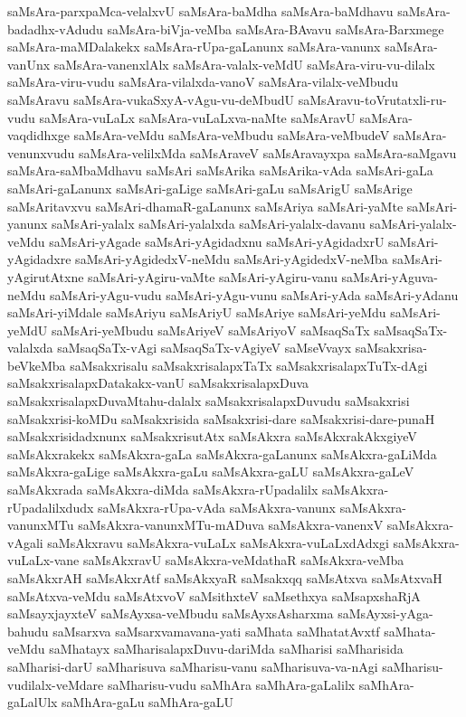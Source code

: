 {saMsAra-parxpaMca-velalxvU
saMsAra-baMdha
saMsAra-baMdhavu
saMsAra-badadhx-vAdudu
saMsAra-biVja-veMba
saMsAra-BAvavu
saMsAra-Barxmege
saMsAra-maMDalakekx
saMsAra-rUpa-gaLanunx
saMsAra-vanunx
saMsAra-vanUnx
saMsAra-vanenxlAlx
saMsAra-valalx-veMdU
saMsAra-viru-vu-dilalx
saMsAra-viru-vudu
saMsAra-vilalxda-vanoV
saMsAra-vilalx-veMbudu
saMsAravu
saMsAra-vukaSxyA-vAgu-vu-deMbudU
saMsAravu-toVrutatxli-ru-vudu
saMsAra-vuLaLx
saMsAra-vuLaLxva-naMte
saMsAravU
saMsAra-vaqdidhxge
saMsAra-veMdu
saMsAra-veMbudu
saMsAra-veMbudeV
saMsAra-venunxvudu
saMsAra-velilxMda
saMsAraveV
saMsAravayxpa
saMsAra-saMgavu
saMsAra-saMbaMdhavu
saMsAri
saMsArika
saMsArika-vAda
saMsAri-gaLa
saMsAri-gaLanunx
saMsAri-gaLige
saMsAri-gaLu
saMsArigU
saMsArige
saMsAritavxvu
saMsAri-dhamaR-gaLanunx
saMsAriya
saMsAri-yaMte
saMsAri-yanunx
saMsAri-yalalx
saMsAri-yalalxda
saMsAri-yalalx-davanu
saMsAri-yalalx-veMdu
saMsAri-yAgade
saMsAri-yAgidadxnu
saMsAri-yAgidadxrU
saMsAri-yAgidadxre
saMsAri-yAgidedxV-neMdu
saMsAri-yAgidedxV-neMba
saMsAri-yAgirutAtxne
saMsAri-yAgiru-vaMte
saMsAri-yAgiru-vanu
saMsAri-yAguva-neMdu
saMsAri-yAgu-vudu
saMsAri-yAgu-vunu
saMsAri-yAda
saMsAri-yAdanu
saMsAri-yiMdale
saMsAriyu
saMsAriyU
saMsAriye
saMsAri-yeMdu
saMsAri-yeMdU
saMsAri-yeMbudu
saMsAriyeV
saMsAriyoV
saMsaqSaTx
saMsaqSaTx-valalxda
saMsaqSaTx-vAgi
saMsaqSaTx-vAgiyeV
saMseVvayx
saMsakxrisa-beVkeMba
saMsakxrisalu
saMsakxrisalapxTaTx
saMsakxrisalapxTuTx-dAgi
saMsakxrisalapxDatakakx-vanU
saMsakxrisalapxDuva
saMsakxrisalapxDuvaMtahu-dalalx
saMsakxrisalapxDuvudu
saMsakxrisi
saMsakxrisi-koMDu
saMsakxrisida
saMsakxrisi-dare
saMsakxrisi-dare-punaH
saMsakxrisidadxnunx
saMsakxrisutAtx
saMsAkxra
saMsAkxrakAkxgiyeV
saMsAkxrakekx
saMsAkxra-gaLa
saMsAkxra-gaLanunx
saMsAkxra-gaLiMda
saMsAkxra-gaLige
saMsAkxra-gaLu
saMsAkxra-gaLU
saMsAkxra-gaLeV
saMsAkxrada
saMsAkxra-diMda
saMsAkxra-rUpadalilx
saMsAkxra-rUpadalilxdudx
saMsAkxra-rUpa-vAda
saMsAkxra-vanunx
saMsAkxra-vanunxMTu
saMsAkxra-vanunxMTu-mADuva
saMsAkxra-vanenxV
saMsAkxra-vAgali
saMsAkxravu
saMsAkxra-vuLaLx
saMsAkxra-vuLaLxdAdxgi
saMsAkxra-vuLaLx-vane
saMsAkxravU
saMsAkxra-veMdathaR
saMsAkxra-veMba
saMsAkxrAH
saMsAkxrAtf
saMsAkxyaR
saMsakxqq
saMsAtxva
saMsAtxvaH
saMsAtxva-veMdu
saMsAtxvoV
saMsithxteV
saMsethxya
saMsapxshaRjA
saMsayxjayxteV
saMsAyxsa-veMbudu
saMsAyxsAsharxma
saMsAyxsi-yAga-bahudu
saMsarxva
saMsarxvamavana-yati
saMhata
saMhatatAvxtf
saMhata-veMdu
saMhatayx
saMharisalapxDuvu-dariMda
saMharisi
saMharisida
saMharisi-darU
saMharisuva
saMharisu-vanu
saMharisuva-va-nAgi
saMharisu-vudilalx-veMdare
saMharisu-vudu
saMhAra
saMhAra-gaLalilx
saMhAra-gaLalUlx
saMhAra-gaLu
saMhAra-gaLU
}
